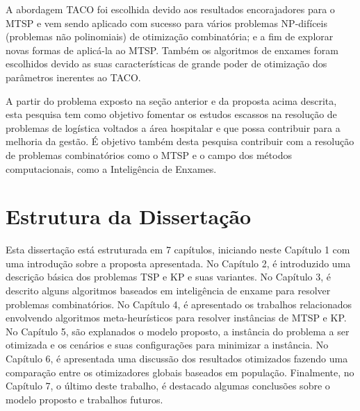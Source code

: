 A abordagem TACO foi escolhida devido aos resultados encorajadores para o MTSP e vem sendo aplicado com sucesso para vários problemas NP-difíceis (problemas não polinomiais) de otimização combinatória; e a fim de explorar novas formas de aplicá-la ao MTSP. Também os algoritmos de enxames foram escolhidos devido as suas características de grande poder de otimização dos parâmetros inerentes ao TACO.

A partir do problema exposto na seção anterior e da proposta acima descrita, esta pesquisa tem como objetivo fomentar os estudos escassos na resolução de problemas de logística voltados a área hospitalar e que possa contribuir para a melhoria da gestão. É objetivo também desta pesquisa contribuir com a resolução de problemas combinatórios como o MTSP e o campo dos métodos computacionais, como a Inteligência de Enxames.

\section{Estrutura da Dissertação}
\label{sec-estrutura}

Esta dissertação está estruturada em 7 capítulos, iniciando neste Capítulo 1 com uma introdução sobre a proposta apresentada. No Capítulo 2, é introduzido uma descrição básica dos problemas TSP e KP e suas variantes. No Capítulo 3, é descrito alguns algoritmos baseados em inteligência de enxame para resolver problemas combinatórios. No Capítulo 4, é apresentado os trabalhos relacionados envolvendo algoritmos meta-heurísticos para resolver instâncias de MTSP e KP. No Capítulo 5, são explanados o modelo proposto, a instância do problema a ser otimizada e os cenários e suas configurações para minimizar a instância. No Capítulo 6, é apresentada uma discussão dos resultados otimizados fazendo uma comparação entre os otimizadores globais baseados em população. Finalmente, no Capítulo 7, o último deste trabalho, é destacado algumas conclusões sobre o modelo proposto e trabalhos futuros.